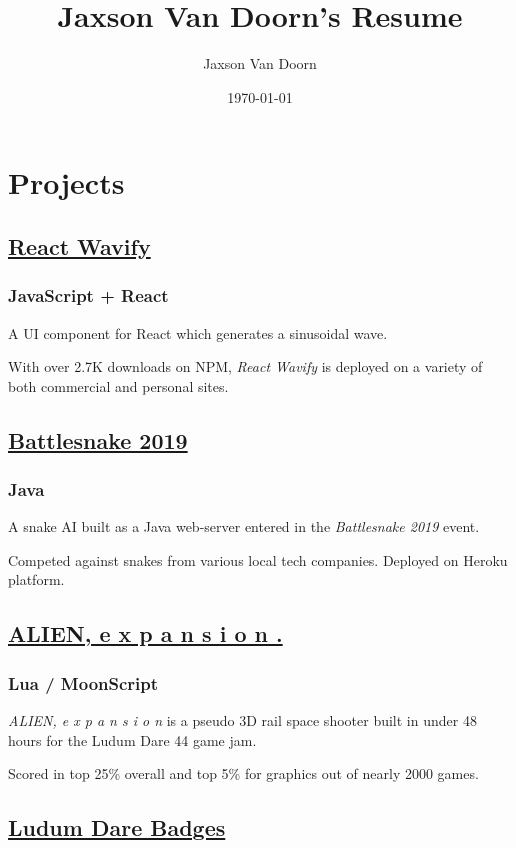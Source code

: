 \documentclass[letterpaper]{article}
\author{Jaxson Van Doorn}
\date{\today}
\title{Jaxson Van Doorn's Resume}
\begin{document}
 
\section{Projects}
\label{sec:org2d42098}
\subsection{\href{https://github.com/woofers/react-wavify}{React Wavify}}
\label{sec:orgf9c27b1}
\subsubsection{JavaScript + React}
\label{sec:org2df0079}
A UI component for React which generates a sinusoidal wave.

With over 2.7K downloads on NPM, \emph{React Wavify} is deployed on a variety of both commercial and personal sites.
\subsection{\href{https://github.com/woofers/battlesnake-2019}{Battlesnake 2019}}
\label{sec:org2c7c705}
\subsubsection{Java}
\label{sec:orgbd8c7b9}
A snake AI built as a Java web-server entered in the \emph{Battlesnake 2019} event.

Competed against snakes from various local tech companies.  Deployed on Heroku platform.

\subsection{\href{https://github.com/woofers/ludum-dare-44}{ALIEN, e x p a n s i o n .}}
\label{sec:orgf844cf1}
\subsubsection{Lua / MoonScript}
\label{sec:org8a1a881}
\emph{ALIEN, e x p a n s i o n} is a pseudo 3D rail space shooter built in under 48 hours for the Ludum Dare 44 game jam.

Scored in top 25\% overall and top 5\% for graphics out of nearly 2000 games.

\subsection{\href{https://github.com/woofers/ludum-dare-badges}{Ludum Dare Badges}}
\label{sec:orgca1e5c0}
\end{document}
